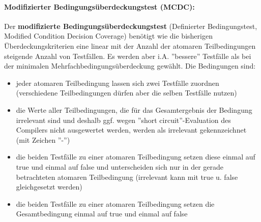 \paragraph{Modifizierter Bedingungsüberdeckungstest (MCDC):}

Der \textbf{modifizierte Bedingungsüberdeckungstest} (Definierter Bedingungstest, Modified Condition Decision Coverage) benötigt wie die bisherigen Überdeckungskriterien eine linear mit der Anzahl der atomaren Teilbedingungen steigende Anzahl von Testfällen. Es werden aber i.A. ''bessere'' Testfälle als bei der minimalen Mehrfachbedingungsüberdeckung gewählt. Die Bedingungen sind:
\begin{itemize}
	\item jeder atomaren Teilbedingung lassen sich zwei Testfälle zuordnen (verschiedene Teilbedingungen dürfen aber die selben Testfälle nutzen)
	\item die Werte aller Teilbedingungen, die für das Gesamtergebnis der Bedingung irrelevant sind und deshalb ggf. wegen ''short circuit''-Evaluation des Compilers nicht ausgewertet werden, werden als irrelevant gekennzeichnet (mit Zeichen ''-'')
	\item die beiden Testfälle zu einer atomaren Teilbedingung setzen diese einmal auf true und einmal auf false und unterscheiden sich nur in der gerade betrachteten atomaren Teilbedingung (irrelevant kann mit true u. false gleichgesetzt werden)
	\item die beiden Testfälle zu einer atomaren Teilbedingung setzen die Gesamtbedingung einmal auf  true und einmal auf false
\end{itemize}

